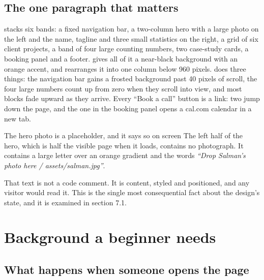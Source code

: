 \documentclass[11pt,a4paper]{article}
\begin{document}
\subsection{The one paragraph that matters}

 stacks six bands: a fixed navigation bar, a two-column hero with
a large photo on the left and the name, tagline and three small statistics on the
right, a grid of six client projects, a band of four large counting numbers, two
case-study cards, a booking panel and a footer.  gives all of it a
near-black background with an orange accent, and rearranges it into one column
below 960 pixels.  does three things: the navigation bar gains a
frosted background past 40 pixels of scroll, the four large numbers count up from
zero when they scroll into view, and most blocks fade upward as they arrive. Every
``Book a call'' button is a link: two jump down the page, and the one in the
booking panel opens a cal.com calendar in a new tab.

\begin{keyidea}{The hero photo is a placeholder, and it says so on screen}
The left half of the hero, which is half the visible page when it loads, contains
no photograph. It contains a large letter  over an orange gradient and the
words \emph{``Drop Salman's photo here / assets/salman.jpg''}.

That text is not a code comment. It is content, styled and positioned, and any
visitor would read it. This is the single most consequential fact about the
design's state, and it is examined in section 7.1.
\end{keyidea}

\section{Background a beginner needs}

\subsection{What happens when someone opens the page}
\end{document}
